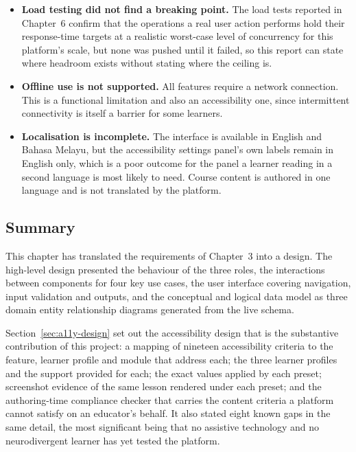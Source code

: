 \documentclass[12pt, oneside]{article} %
\begin{document}
\begin{itemize}
    \item \textbf{Load testing did not find a breaking point.} The load tests reported in Chapter~6 confirm that the operations a real user action performs hold their response-time targets at a realistic worst-case level of concurrency for this platform's scale, but none was pushed until it failed, so this report can state where headroom exists without stating where the ceiling is.

    \item \textbf{Offline use is not supported.} All features require a network connection. This is a functional limitation and also an accessibility one, since intermittent connectivity is itself a barrier for some learners.

    \item \textbf{Localisation is incomplete.} The interface is available in English and Bahasa Melayu, but the accessibility settings panel's own labels remain in English only, which is a poor outcome for the panel a learner reading in a second language is most likely to need. Course content is authored in one language and is not translated by the platform.
\end{itemize}

\subsection{Summary}

This chapter has translated the requirements of Chapter~3 into a design. The high-level design presented the behaviour of the three roles, the interactions between components for four key use cases, the user interface covering navigation, input validation and outputs, and the conceptual and logical data model as three domain entity relationship diagrams generated from the live schema.

Section~\ref{sec:a11y-design} set out the accessibility design that is the substantive contribution of this project: a mapping of nineteen accessibility criteria to the feature, learner profile and module that address each; the three learner profiles and the support provided for each; the exact values applied by each preset; screenshot evidence of the same lesson rendered under each preset; and the authoring-time compliance checker that carries the content criteria a platform cannot satisfy on an educator's behalf. It also stated eight known gaps in the same detail, the most significant being that no assistive technology and no neurodivergent learner has yet tested the platform.
\end{document}
